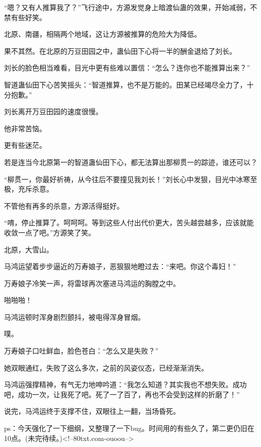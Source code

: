 \begin{this_body}
“嗯？又有人推算我了？”飞行途中，方源发觉身上暗渡仙蛊的效果，开始减弱，不禁有些好笑。

北原、南疆，相隔两个地域，这让方源被推算的危险大为降低。

果不其然。在北原的万豆田园之中，蛊仙田下心将一半的酬金退给了刘长。

刘长的脸色相当难看，目光中更有些难以置信：“怎么？连你也不能推算出来？”

智道蛊仙田下心苦笑摇头：“智道推算，也不是万能的。田某已经竭尽全力了，十分抱歉。”

刘长离开万豆田园的速度很慢。

他非常苦恼。

更有些迷茫。

若是连当今北原第一的智道蛊仙田下心，都无法算出那柳贯一的踪迹，谁还可以？

“柳贯一，你最好祈祷，从今往后不要撞见我刘长！”刘长心中发狠，目光中冰寒至极，充斥杀意。

不管他有再多的杀意，方源活得挺好。

“唷，停止推算了。呵呵呵。等到这些人付出代价更大，苦头越尝越多，应该就能收敛一点了吧。”方源笑了笑。

北原，大雪山。

马鸿运望着步步逼近的万寿娘子，恶狠狠地瞪过去：“来吧。你这个毒妇！”

万寿娘子冷笑一声，将雷球再次塞进马鸿运的胸膛之中。

啪啪啪！

马鸿运顿时浑身剧烈颤抖，被电得浑身冒烟。

噗。

万寿娘子口吐鲜血，脸色苍白：“怎么又是失败？”

她双眼通红，失败了这么多次，之前的风姿仪态，已经渐渐消失。

马鸿运强撑精神，有气无力地呻吟道：“我怎么知道？其实我也不想失败。成功吧，成功一次，让我死了吧。死了一了百了，再也不会受到这样的折磨了！”

说完，马鸿运终于支撑不住，双眼往上一翻，当场昏死。

ps：今天强化了一下细纲，又整理了一下bug。时间用的有些久了，第二更仍旧在10点。(未完待续。)<!--80txt.com-ouoou-->

\end{this_body}

